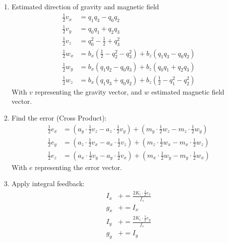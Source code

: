 \documentclass[ti,oneside,10pt]{uantwerpenreport}
\begin{document}
\begin{enumerate}
\begin{align}
            b_x &= \sqrt{h_x^2 + h_y^2} \\
            b_z &= 2\!\left[m_x(q_1 q_3 - q_0 q_2) + m_y(q_2 q_3 + q_0 q_1) + m_z\!\left(\tfrac{1}{2} - q_1^2 - q_2^2\right)\right]
        \end{align}
        With $h$ representing the magnetic field vector, and $b$ Earth's magnetic field vector.
    \item Estimated direction of gravity and magnetic field
        \begin{align}
            \tfrac{1}{2}v_x &= q_1 q_3 - q_0 q_2 \\
            \tfrac{1}{2}v_y &= q_0 q_1 + q_2 q_3 \\
            \tfrac{1}{2}v_z &= q_0^2 - \tfrac{1}{2} + q_3^2 \\[6pt]
            \tfrac{1}{2}w_x &= b_x\!\left(\tfrac{1}{2} - q_2^2 - q_3^2\right) + b_z(q_1 q_3 - q_0 q_2) \\
            \tfrac{1}{2}w_y &= b_x(q_1 q_2 - q_0 q_3) + b_z(q_0 q_1 + q_2 q_3) \\
            \tfrac{1}{2}w_z &= b_x(q_1 q_3 + q_0 q_2) + b_z\!\left(\tfrac{1}{2} - q_1^2 - q_2^2\right)
        \end{align}
        With $v$ representing the gravity vector, and $w$ estimated magnetic field vector.
    \item Find the error (Cross Product):
        \begin{align}
            \tfrac{1}{2}e_x &= (a_y \cdot \tfrac{1}{2}v_z - a_z \cdot \tfrac{1}{2}v_y) + (m_y \cdot \tfrac{1}{2}w_z - m_z \cdot \tfrac{1}{2}w_y) \\
            \tfrac{1}{2}e_y &= (a_z \cdot \tfrac{1}{2}v_x - a_x \cdot \tfrac{1}{2}v_z) + (m_z \cdot \tfrac{1}{2}w_x - m_x \cdot \tfrac{1}{2}w_z) \\
            \tfrac{1}{2}e_z &= (a_x \cdot \tfrac{1}{2}v_y - a_y \cdot \tfrac{1}{2}v_x) + (m_x \cdot \tfrac{1}{2}w_y - m_y \cdot \tfrac{1}{2}w_x)
        \end{align}
        With $e$ representing the error vector.
    \item Apply integral feedback:
        \begin{align}
            I_x &\mathrel{+}= \frac{2K_i \cdot \tfrac{1}{2}e_x}{f_s} \\
            g_x &\mathrel{+}= I_x \\
            I_y &\mathrel{+}= \frac{2K_i \cdot \tfrac{1}{2}e_y}{f_s} \\
            g_y &\mathrel{+}= I_y \\

\end{align}
\end{enumerate}
\end{document}

